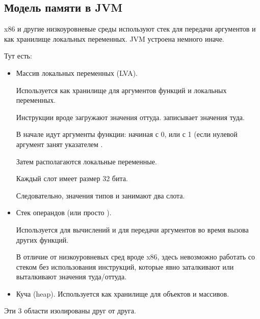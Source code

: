\subsection{Модель памяти в \ac{JVM}}


x86 и другие низкоуровневые среды используют стек для передачи аргументов и как
хранилище локальных переменных.
\ac{JVM} устроена немного иначе.

Тут есть:

\begin{itemize}
\item Массив локальных переменных (\ac{LVA}).

Используется как хранилище для аргументов функций и локальных переменных.

Инструкции вроде  загружают значения оттуда.
 записывает значения туда.

В начале идут аргументы функции: начиная с 0, или с 1 
(если нулевой аргумент занят указателем .

Затем располагаются локальные переменные.


Каждый слот имеет размер 32 бита.

Следовательно, значения типов  и  занимают два слота.

\item Стек операндов (или просто ).

Используется для вычислений и для передачи аргументов во время вызова других функций.

В отличие от низкоуровневых сред вроде x86, здесь невозможно работать со стеком
без использования инструкций, которые явно заталкивают или выталкивают значения туда/оттуда.

\item 
Куча (heap). Используется как хранилище для объектов и массивов.
\end{itemize}


Эти 3 области изолированы друг от друга.
